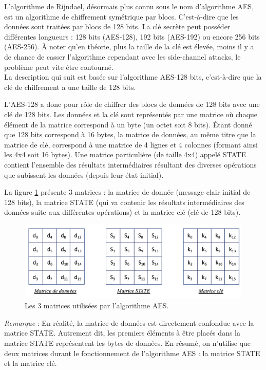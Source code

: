 \documentclass[10pt, oneside, a4paper]{article}
\begin{document}
L'algorithme de Rijndael, désormais plus connu sous le nom d'algorithme AES, est un algorithme de chiffrement symétrique par blocs. C'est-à-dire que les données sont traitées par blocs de 128 bits. La clé secrète peut posséder différentes longueurs : 128 bits (AES-128), 192 bits (AES-192) ou encore 256 bits (AES-256). À noter qu'en théorie, plus la taille de la clé est élevée, moins il y a de chance de casser l'algorithme cependant avec les side-channel attacks, le problème peut vite être contourné. \\ La description qui suit est basée sur l'algorithme AES-128 bits, c'est-à-dire que la clé de chiffrement a une taille de 128 bits.

L'AES-128 a donc pour rôle de chiffrer des blocs de données de 128 bits avec une clé de 128 bits. Les données et la clé sont représentés par une matrice où chaque élément de la matrice correspond à un byte (un octet soit 8 bits). Étant donné que 128 bits correspond à 16 bytes, la matrice de données, au même titre que la matrice de clé, correspond à une matrice de 4 lignes et 4 colonnes (formant ainsi les 4x4 soit 16 bytes). Une matrice particulière (de taille 4x4) appelé STATE contient l'ensemble des résultats intermédiaires résultant des diverses opérations que subissent les données (depuis leur état initial). 

La figure \ref{fig:matrix} présente 3 matrices : la matrice de donnée (message clair initial de 128 bits), la matrice STATE (qui va contenir les résultats intermédiaires des données suite aux différentes opérations) et la matrice clé (clé de 128 bits).
\begin{figure}[htbp]
    \centering
    \includegraphics[scale=0.75]{image/matrix}
    \caption{Les 3 matrices utilisées par l'algorithme AES.}
    \label{fig:matrix}
\end{figure}

\textit{Remarque} : En réalité, la matrice de données est directement confondue avec la matrice STATE. Autrement dit, les premiers éléments à être placés dans la matrice STATE représentent les bytes de données. En résumé, on n'utilise que deux matrices durant le fonctionnement de l'algorithme AES : la matrice STATE et la matrice clé.
\end{document}
